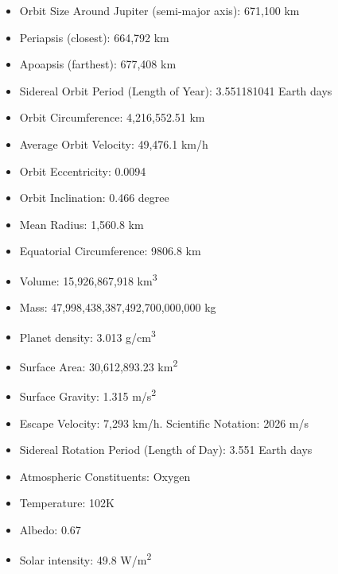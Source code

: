 \begin{itemize}
\item{Orbit Size Around Jupiter (semi-major axis):}  671,100 km
\item{Periapsis (closest):}  664,792 km
\item{Apoapsis (farthest):}  677,408 km
\item{Sidereal Orbit Period (Length of Year):} 3.551181041 Earth days
\item{Orbit Circumference:}  4,216,552.51 km
\item{Average Orbit Velocity:}  49,476.1 km/h
\item{Orbit Eccentricity:} 0.0094
\item{Orbit Inclination:} 0.466 degree
\item{Mean Radius:}  1,560.8 km
\item{Equatorial Circumference:}  9806.8 km
\item{Volume:}  15,926,867,918 \si{km^3}
\item{Mass:}  47,998,438,387,492,700,000,000 kg
\item{Planet density:}  3.013 \si{g/cm^3}
\item{Surface Area:}  30,612,893.23 \si{km^2}
\item{Surface Gravity:}  1.315 \si{m/s^2}
\item{Escape Velocity:}  7,293 km/h. Scientific Notation: 2026 m/s
\item{Sidereal Rotation Period (Length of Day):} 3.551 Earth days
\item{Atmospheric Constituents:} Oxygen
\item{Temperature:} 102K
\item{Albedo:} 0.67
\item{Solar intensity:} 49.8 \si{W/m^2}
\end{itemize}




